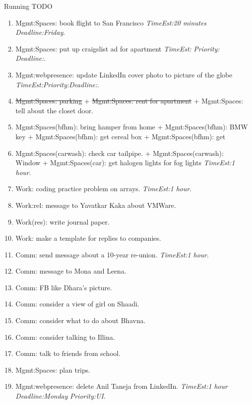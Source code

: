 \documentclass[serif, mathserif, final]{beamer}
\newcommand{\doneTaskNoItem}[1]{\sout{#1}}
\newcommand{\te}[1]{\textit{TimeEst:}\textit{#1}}
\newcommand{\dl}[1]{\textit{Deadline:}\textit{#1}}
\newcommand{\pr}[1]{\textit{Priority:}\textit{#1}}
\begin{document}
\begin{frame}
\begin{columns}
\begin{column}{0.5\linewidth}
\begin{block}{Running TODO}
\begin{enumerate}
        \item \tiny Mgmt:Spaces: book flight to San Francisco \te{20
          minutes} \dl{Friday}. 
        \item \tiny Mgmt:Spaces: put up craigslist ad for
          apartment \te{} \pr{} \dl{}. 
        \item \tiny Mgmt:webpresence: update LinkedIn cover photo to 
          picture of the globe \te{}\pr{}\dl{}. 

        \item \tiny \doneTaskNoItem{Mgmt:Spaces: parking} + \doneTaskNoItem{Mgmt:Spaces: rent for apartment} +
          Mgmt:Spaces: tell about the closet door. 

        \item \tiny Mgmt:Spaces(bfhm): bring hamper from home +
          Mgmt:Spaces(bfhm): BMW key + Mgmt:Spaces(bfhm): get cereal
          box + Mgmt:Spaces(bfhm): get 

        \item \tiny Mgmt:Spaces(carwash): check car tailpipe. +
          Mgmt:Spaces(carwash): Window + Mgmt:Spaces(car): get halogen
          lights for fog lights \te{1 hour}.
        \item \tiny Work: coding practice problem on arrays. \te{1
          hour}. 

        \item \tiny Work:rel: message to Yavatkar Kaka about VMWare.
        \item \tiny Work(res): write journal paper. 
        \item \tiny Work: make a template for replies to companies. 
        \item \tiny Comm: send message about a 10-year re-union. \te{1
          hour}. 

        \item \tiny Comm: message to Mona and Leena.  
        \item \tiny Comm: FB like Dhara's picture.
        \item \tiny Comm: consider a view of girl on Shaadi. 
        \item \tiny Comm: consider what to do about Bhavna. 
        \item \tiny Comm: consider talking to Illina. 
        \item \tiny Comm: talk to friends from school.           
        \item \tiny Mgmt:Spaces: plan trips.

        \item \tiny Mgmt:webpresence: delete Anil Taneja from
          LinkedIn. \te{1 hour} \dl{Monday} \pr{UI}. 


\end{enumerate}
\end{block}
\end{column}
\end{columns}
\end{frame}
\end{document}
